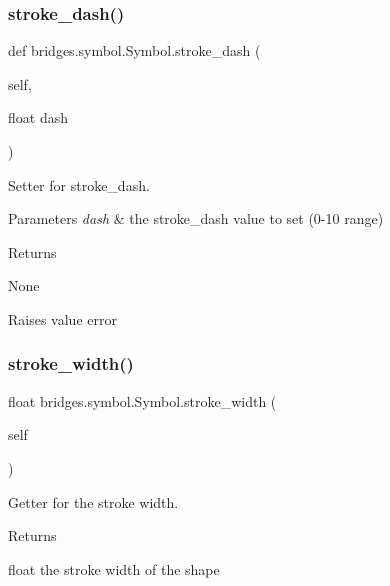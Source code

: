 \subsubsection{\texorpdfstring{stroke\_dash()}{stroke\_dash()}\hspace{0.1cm}{\footnotesize\ttfamily [2/2]}}
{\footnotesize\ttfamily def bridges.\+symbol.\+Symbol.\+stroke\+\_\+dash (\begin{DoxyParamCaption}\item[{}]{self,  }\item[{float}]{dash }\end{DoxyParamCaption})}



Setter for stroke\+\_\+dash. 


\begin{DoxyParams}{Parameters}
{\em dash} & the stroke\+\_\+dash value to set (0-\/10 range) \\
\hline
\end{DoxyParams}
\begin{DoxyReturn}{Returns}


None 

Raises value error 
\end{DoxyReturn}
\mbox{\label{classbridges_1_1symbol_1_1_symbol_a06f71901e5635aabfb19c6c36f256243}} 
\subsubsection{\texorpdfstring{stroke\_width()}{stroke\_width()}\hspace{0.1cm}{\footnotesize\ttfamily [1/2]}}
{\footnotesize\ttfamily  float bridges.\+symbol.\+Symbol.\+stroke\+\_\+width (\begin{DoxyParamCaption}\item[{}]{self }\end{DoxyParamCaption})}



Getter for the stroke width. 

\begin{DoxyReturn}{Returns}


float the stroke width of the shape 
\end{DoxyReturn}
\mbox{\label{classbridges_1_1symbol_1_1_symbol_a6ba72f9fc81be71cc784ededb34e5acf}} 
